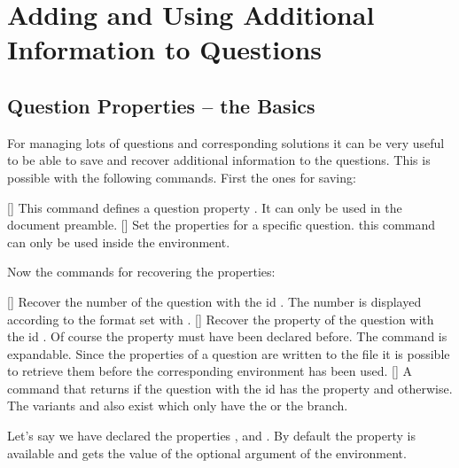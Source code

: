 \documentclass[load-preamble+]{cnltx-doc}
\begin{document}
\section{Adding and Using Additional Information to
  Questions}\label{sec:additional_info}
\subsection{Question Properties -- the Basics}

For managing lots of questions and corresponding solutions it can be very
useful to be able to save and recover additional information to the questions.
This is possible with the following commands.  First the ones for saving:
\begin{commands}
  []
    This command defines a question property .  It can only be
    used in the document preamble.
  []
    Set the properties for a specific question. this command can only be used
    inside the  environment.
\end{commands}
Now the commands for recovering the properties:
\begin{commands}
  []
    Recover the number of the question with the \acs{id} .  The
    number is displayed according to the format set with
    .
  \expandable{}[]
    Recover the property  of the question with the \acs{id}
    .  Of course the property must have been declared before.  The
    command is expandable.  Since the properties of a
    question are written to the  file it is possible to retrieve
    them before the corresponding  environment has been used.
  \expandable{}[]
    A command that returns  if the question with
    the \acs{id}  has the property  and 
    otherwise.  The variants  and
     also exist which only have the  or the
     branch.
\end{commands}

Let's say we have declared the properties ,  and
.  By default the property  is available and gets the
value of the optional argument of the  environment.
\end{document}
